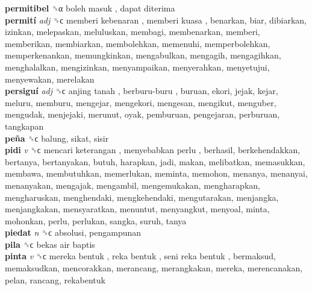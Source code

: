 \textbf{permitibel} ␝α   boleh masuk ,  dapat diterima   \\
\textbf{permití} \emph{adj}  ␝ϲ   memberi kebenaran ,  memberi kuasa , benarkan, biar, dibiarkan, izinkan, melepaskan, meluluskan, membagi, membenarkan, memberi, memberikan, membiarkan, membolehkan, memenuhi, memperbolehkan, memperkenankan, memungkinkan, mengabulkan, mengagih, mengagihkan, menghalalkan, mengizinkan, menyampaikan, menyerahkan, menyetujui, menyewakan, merelakan  \\
\textbf{persiguí} \emph{adj}  ␝ϲ   anjing tanah ,  berburu-buru , buruan, ekori, jejak, kejar, meluru, memburu, mengejar, mengekori, mengesan, mengikut, menguber, mengudak, menjejaki, merunut, oyak, pemburuan, pengejaran, perburuan, tangkapan  \\
\textbf{peña} ␝ϲ  balung, sikat, sisir  \\
\textbf{pidi} \emph{v}  ␝ϲ   mencari keterangan ,  menyebabkan perlu , berhasil, berkehendakkan, bertanya, bertanyakan, butuh, harapkan, jadi, makan, melibatkan, memasukkan, membawa, membutuhkan, memerlukan, meminta, memohon, menanya, menanyai, menanyakan, mengajak, mengambil, mengemukakan, mengharapkan, mengharuskan, menghendaki, mengkehendaki, mengutarakan, menjangka, menjangkakan, mensyaratkan, menuntut, menyangkut, menyoal, minta, mohonkan, perlu, perlukan, sangka, suruh, tanya  \\
\textbf{piedat} \emph{n}  ␝ϲ  absolusi, pengampunan  \\
\textbf{pila} ␝ϲ   bekas air baptis   \\
\textbf{pinta} \emph{v}  ␝ϲ   mereka bentuk ,  reka bentuk ,  seni reka bentuk , bermaksud, memaksudkan, mencorakkan, merancang, merangkakan, mereka, merencanakan, pelan, rancang, rekabentuk  \\
